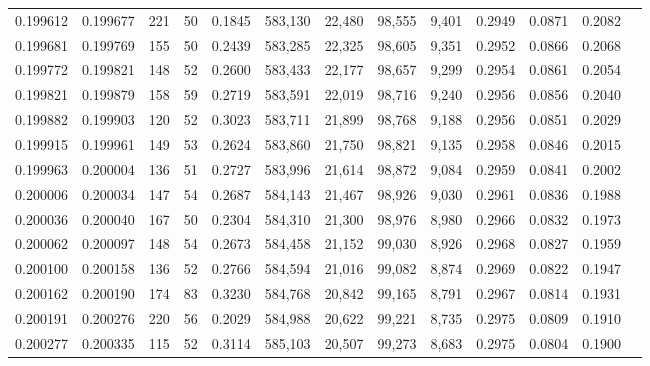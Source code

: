 \begin{tabular}{rrrrrrrrrrrrr}
0.199612 & 0.199677 &   221 &  50 &                                     0.1845 & 583,130 &  22,480 &  98,555 &   9,401 & 0.2949 & 0.0871 & 0.2082 \\
0.199681 & 0.199769 &   155 &  50 &                                     0.2439 & 583,285 &  22,325 &  98,605 &   9,351 & 0.2952 & 0.0866 & 0.2068 \\
0.199772 & 0.199821 &   148 &  52 &                                     0.2600 & 583,433 &  22,177 &  98,657 &   9,299 & 0.2954 & 0.0861 & 0.2054 \\
0.199821 & 0.199879 &   158 &  59 &                                     0.2719 & 583,591 &  22,019 &  98,716 &   9,240 & 0.2956 & 0.0856 & 0.2040 \\
0.199882 & 0.199903 &   120 &  52 &                                     0.3023 & 583,711 &  21,899 &  98,768 &   9,188 & 0.2956 & 0.0851 & 0.2029 \\
0.199915 & 0.199961 &   149 &  53 &                                     0.2624 & 583,860 &  21,750 &  98,821 &   9,135 & 0.2958 & 0.0846 & 0.2015 \\
0.199963 & 0.200004 &   136 &  51 &                                     0.2727 & 583,996 &  21,614 &  98,872 &   9,084 & 0.2959 & 0.0841 & 0.2002 \\
0.200006 & 0.200034 &   147 &  54 &                                     0.2687 & 584,143 &  21,467 &  98,926 &   9,030 & 0.2961 & 0.0836 & 0.1988 \\
0.200036 & 0.200040 &   167 &  50 &                                     0.2304 & 584,310 &  21,300 &  98,976 &   8,980 & 0.2966 & 0.0832 & 0.1973 \\
0.200062 & 0.200097 &   148 &  54 &                                     0.2673 & 584,458 &  21,152 &  99,030 &   8,926 & 0.2968 & 0.0827 & 0.1959 \\
0.200100 & 0.200158 &   136 &  52 &                                     0.2766 & 584,594 &  21,016 &  99,082 &   8,874 & 0.2969 & 0.0822 & 0.1947 \\
0.200162 & 0.200190 &   174 &  83 &                                     0.3230 & 584,768 &  20,842 &  99,165 &   8,791 & 0.2967 & 0.0814 & 0.1931 \\
0.200191 & 0.200276 &   220 &  56 &                                     0.2029 & 584,988 &  20,622 &  99,221 &   8,735 & 0.2975 & 0.0809 & 0.1910 \\
0.200277 & 0.200335 &   115 &  52 &                                     0.3114 & 585,103 &  20,507 &  99,273 &   8,683 & 0.2975 & 0.0804 & 0.1900 \\

\end{tabular}
